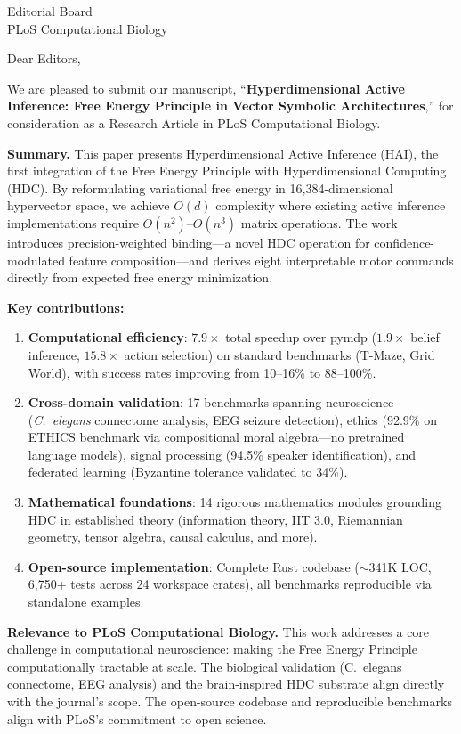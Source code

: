 \documentclass[11pt]{letter}
\begin{document}
\begin{letter}{Editorial Board\\PLoS Computational Biology}

\opening{Dear Editors,}

We are pleased to submit our manuscript, ``\textbf{Hyperdimensional Active Inference: Free Energy Principle in Vector Symbolic Architectures},'' for consideration as a Research Article in PLoS Computational Biology.

\textbf{Summary.} This paper presents Hyperdimensional Active Inference (HAI), the first integration of the Free Energy Principle with Hyperdimensional Computing (HDC). By reformulating variational free energy in 16,384-dimensional hypervector space, we achieve $O(d)$ complexity where existing active inference implementations require $O(n^2)$--$O(n^3)$ matrix operations. The work introduces precision-weighted binding---a novel HDC operation for confidence-modulated feature composition---and derives eight interpretable motor commands directly from expected free energy minimization.

\textbf{Key contributions:}
\begin{enumerate}
    \item \textbf{Computational efficiency}: $7.9\times$ total speedup over pymdp ($1.9\times$ belief inference, $15.8\times$ action selection) on standard benchmarks (T-Maze, Grid World), with success rates improving from 10--16\% to 88--100\%.
    \item \textbf{Cross-domain validation}: 17 benchmarks spanning neuroscience (\textit{C.~elegans} connectome analysis, EEG seizure detection), ethics (92.9\% on ETHICS benchmark via compositional moral algebra---no pretrained language models), signal processing (94.5\% speaker identification), and federated learning (Byzantine tolerance validated to 34\%).
    \item \textbf{Mathematical foundations}: 14 rigorous mathematics modules grounding HDC in established theory (information theory, IIT 3.0, Riemannian geometry, tensor algebra, causal calculus, and more).
    \item \textbf{Open-source implementation}: Complete Rust codebase ($\sim$341K LOC, 6,750+ tests across 24 workspace crates), all benchmarks reproducible via standalone examples.
\end{enumerate}

\textbf{Relevance to PLoS Computational Biology.} This work addresses a core challenge in computational neuroscience: making the Free Energy Principle computationally tractable at scale. The biological validation (C.~elegans connectome, EEG analysis) and the brain-inspired HDC substrate align directly with the journal's scope. The open-source codebase and reproducible benchmarks align with PLoS's commitment to open science.


\end{letter}
\end{document}
